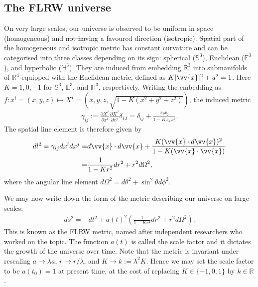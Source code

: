 \documentclass[a4paper,12pt,times,custombib,print,index]{Classes/PhDThesisPSnPDF} %
\providecommand{\DIFadd}[1]{{\protect\color{blue}\uwave{#1}}} %
\providecommand{\DIFdel}[1]{{\protect\color{red}\sout{#1}}}                      %
\providecommand{\DIFaddbegin}{} %
\providecommand{\DIFaddend}{} %
\providecommand{\DIFdelbegin}{} %
\providecommand{\DIFdelend}{} %
\newcommand{\DIFscaledelfig}{0.5}
\newlength{\DIFdelgraphicswidth} %
\newlength{\DIFdelgraphicsheight} %
\newcommand{\DIFaddincludegraphics}[2][]{{\color{blue}\fbox{\DIFOincludegraphics[#1]{#2}}}} %
\newcommand{\DIFdelincludegraphics}[2][]{%
\sbox{\DIFdelgraphicsbox}{\DIFOincludegraphics[#1]{#2}}%
\settoboxwidth{\DIFdelgraphicswidth}{\DIFdelgraphicsbox} %
\settoboxtotalheight{\DIFdelgraphicsheight}{\DIFdelgraphicsbox} %
\scalebox{\DIFscaledelfig}{%
\parbox[b]{\DIFdelgraphicswidth}{\usebox{\DIFdelgraphicsbox}\\[-\baselineskip] \rule{\DIFdelgraphicswidth}{0em}}\llap{\resizebox{\DIFdelgraphicswidth}{\DIFdelgraphicsheight}{%
\setlength{\unitlength}{\DIFdelgraphicswidth}%
\begin{picture}(1,1)%
\thicklines\linethickness{2pt} %
{\color[rgb]{1,0,0}\put(0,0){\framebox(1,1){}}}%
{\color[rgb]{1,0,0}\put(0,0){\line( 1,1){1}}}%
{\color[rgb]{1,0,0}\put(0,1){\line(1,-1){1}}}%
\end{picture}%
}\hspace*{3pt}}} %
} %
\DeclareRobustCommand{\DIFaddbegin}{\DIFOaddbegin \let\includegraphics\DIFaddincludegraphics} %
\DeclareRobustCommand{\DIFaddend}{\DIFOaddend \let\includegraphics\DIFOincludegraphics} %
\DeclareRobustCommand{\DIFdelbegin}{\DIFOdelbegin \let\includegraphics\DIFdelincludegraphics} %
\DeclareRobustCommand{\DIFdelend}{\DIFOaddend \let\includegraphics\DIFOincludegraphics} %
\begin{document}
\subsection{The FLRW universe}
On very large scales, our universe is observed to be uniform in space (homogeneous) and \DIFdelbegin \DIFdel{not having }\DIFdelend \DIFaddbegin \DIFadd{does not have }\DIFaddend a favoured direction (isotropic). \DIFdelbegin \DIFdel{Spatial }\DIFdelend \DIFaddbegin \DIFadd{The spatial }\DIFaddend part of the homogeneous and isotropic metric has constant curvature and can be categorised into three classes depending on its sign: spherical ($\mathbb{S}^3$), Euclidean ($\mathbb{E}^3$), and hyperbolic ($\mathbb{H}^3$). They are induced from embedding $\mathbb{R}^3$ into submanifolds of $\mathbb{R}^4$ equipped with the Euclidean metric, defined as $K|\vv{x}|^2 + u^2 = 1$. Here $K=1,0,-1$ for $\mathbb{S}^3$, $\mathbb{E}^3$, and $\mathbb{H}^3$, respectively. Writing the embedding as $f: x^i = (x,y,z) \mapsto X^I =(x,y,z,\sqrt{1-K(x^2+y^2+z^2)})$, the induced metric \DIFaddbegin \DIFadd{is
}\DIFaddend \begin{align}
	\gamma_{ij} := \frac{\partial X^I}{\partial x^i} \frac{\partial X^J}{\partial x^j} \delta_{IJ}
	= \delta_{ij} + \frac{x_i x_j}{1-Kx_k x^k}. \label{eqn:FLRW_metric_spatial}
\end{align}
The spatial line element is therefore given by
\begin{align}
	dl^2 = \gamma_{ij} dx^i dx^j =& d\vv{x} \cdot d\vv{x} + \frac{K(\vv{x} \cdot d\vv{x})^2}{1-K (\vv{x} \cdot \vv{x})} \\
	=& \frac{1}{1-Kr^2} dr^2 + r^2 d\Omega^2,
\end{align}
where the angular line element $d\Omega^2 = d\theta^2 + \sin^2\theta d\phi^2$.

We may now write down the form of the metric describing our universe on large scales;
\begin{align}
	ds^2 = - dt^2 + a(t)^2 \left( \frac{1}{1-Kr^2} dr^2 + r^2 d\Omega^2 \right).
\end{align}
This is known as the FLRW metric, named after independent researchers who worked on the topic. The function $a(t)$ is called the scale factor and it dictates the growth of the universe over time. Note that the metric is invariant under rescaling $a \rightarrow \lambda a$, $r \rightarrow r / \lambda$, and $K \rightarrow k:= \lambda^2 K$. Hence we may set the scale factor to be $a(t_0) = 1$ at present time, at the cost of replacing $K \in \{-1,0,1\}$ by $k \in \mathbb{R}$.
\end{document}
